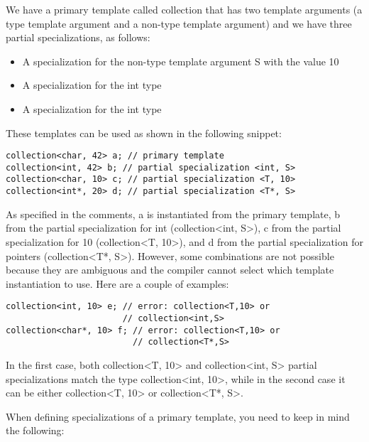 We have a primary template called collection that has two template arguments (a type template argument and a non-type template argument) and we have three partial specializations, as follows:

\begin{itemize}
\item 
A specialization for the non-type template argument S with the value 10

\item 
A specialization for the int type

\item 
A specialization for the int type
\end{itemize}

These templates can be used as shown in the following snippet:

\begin{lstlisting}[style=styleCXX]
collection<char, 42> a; // primary template
collection<int, 42> b; // partial specialization <int, S>
collection<char, 10> c; // partial specialization <T, 10>
collection<int*, 20> d; // partial specialization <T*, S>
\end{lstlisting}

As specified in the comments, a is instantiated from the primary template, b from the partial specialization for int (collection<int, S>), c from the partial specialization for 10 (collection<T, 10>), and d from the partial specialization for pointers (collection<T*, S>). However, some combinations are not possible because they are ambiguous and the compiler cannot select which template instantiation to use. Here are a couple of examples:

\begin{lstlisting}[style=styleCXX]
collection<int, 10> e; // error: collection<T,10> or
                       // collection<int,S>
collection<char*, 10> f; // error: collection<T,10> or
                         // collection<T*,S>
\end{lstlisting}

In the first case, both collection<T, 10> and collection<int, S> partial specializations match the type collection<int, 10>, while in the second case it can be either collection<T, 10> or collection<T*, S>.

When defining specializations of a primary template, you need to keep in mind the following:

